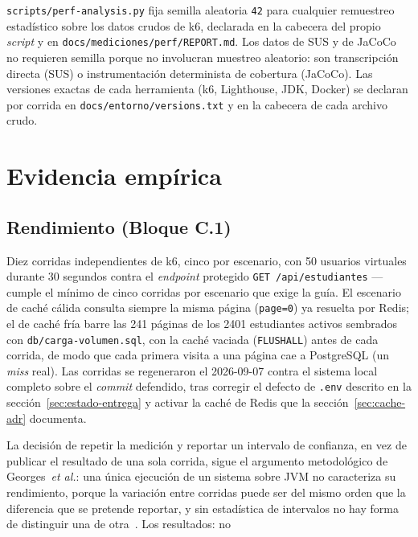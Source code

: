 \documentclass[11pt,a4paper]{article}
\newcommand{\ruta}[1]{\texttt{\footnotesize #1}}
\begin{document}
\ruta{scripts/perf-analysis.py} fija semilla aleatoria \texttt{42} para
cualquier remuestreo estadístico sobre los datos crudos de k6, declarada
en la cabecera del propio \emph{script} y en \ruta{docs/mediciones/perf/REPORT.md}.
Los datos de SUS y de JaCoCo no requieren semilla porque no involucran
muestreo aleatorio: son transcripción directa (SUS) o instrumentación
determinista de cobertura (JaCoCo). Las versiones exactas de cada
herramienta (k6, Lighthouse, JDK, Docker) se declaran por corrida en
\ruta{docs/entorno/versions.txt} y en la cabecera de cada archivo crudo.

\section{Evidencia empírica}
\label{sec:evaluacion}

\subsection{Rendimiento (Bloque C.1)}
\label{sec:rendimiento}

Diez corridas independientes de k6, cinco por escenario, con 50 usuarios
virtuales durante 30 segundos contra el \emph{endpoint} protegido
\texttt{GET /api/estudiantes} — cumple el mínimo de cinco corridas por
escenario que exige la guía. El escenario de caché cálida consulta
siempre la misma página (\texttt{page=0}) ya resuelta por Redis; el de
caché fría barre las 241 páginas de los 2401 estudiantes activos
sembrados con \ruta{db/carga-volumen.sql}, con la caché vaciada
(\texttt{FLUSHALL}) antes de cada corrida, de modo que cada primera
visita a una página cae a PostgreSQL (un \emph{miss} real). Las corridas
se regeneraron el 2026-09-07 contra el sistema local completo sobre el
\emph{commit} defendido, tras corregir el defecto de \ruta{.env}
descrito en la sección~\ref{sec:estado-entrega} y activar la caché de
Redis que la sección~\ref{sec:cache-adr} documenta.

La decisión de repetir la medición y reportar un intervalo de confianza,
en vez de publicar el resultado de una sola corrida, sigue el argumento
metodológico de Georges~\emph{et al.}: una única ejecución de un sistema
sobre JVM no caracteriza su rendimiento, porque la variación entre
corridas puede ser del mismo orden que la diferencia que se pretende
reportar, y sin estadística de intervalos no hay forma de distinguir una
de otra~\cite{georges2007benchmarking}. Los resultados: no
\end{document}
